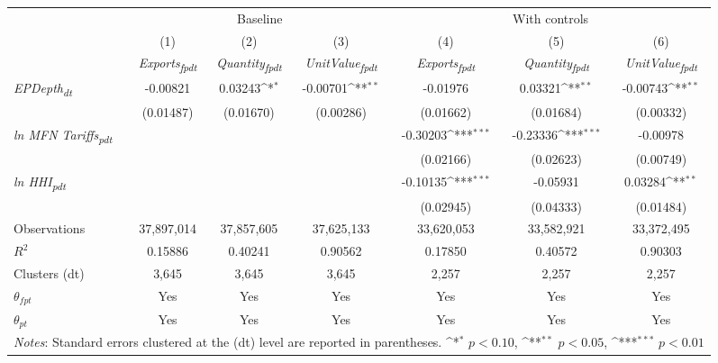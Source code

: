 {
\def\sym#1{\ifmmode^{#1}\else\(^{#1}\)\fi}
\begin{tabular}{l*{6}{c}}
\toprule
&\multicolumn{3}{c}{Baseline}&\multicolumn{3}{c}{With controls}\\\cmidrule(lr){2-4}\cmidrule(lr){5-7}
&(1)&(2)&(3)&(4)&(5)&(6)\\
&\textit{Exports\textsubscript{fpdt}}&\textit{Quantity\textsubscript{fpdt}}&\textit{UnitValue\textsubscript{fpdt}}&\textit{Exports\textsubscript{fpdt}}&\textit{Quantity\textsubscript{fpdt}}&\textit{UnitValue\textsubscript{fpdt}}\\
\midrule
\textit{EPDepth\textsubscript{dt}} & -0.00821 & 0.03243\sym{*} & -0.00701\sym{**} & -0.01976 & 0.03321\sym{**} & -0.00743\sym{**}\\
 & (0.01487) & (0.01670) & (0.00286) & (0.01662) & (0.01684) & (0.00332)\\
\addlinespace
\textit{ln MFN Tariffs\textsubscript{pdt}} &  &  &  & -0.30203\sym{***} & -0.23336\sym{***} & -0.00978\\
 &  &  &  & (0.02166) & (0.02623) & (0.00749)\\
\addlinespace
\textit{ln HHI\textsubscript{pdt}} &  &  &  & -0.10135\sym{***} & -0.05931 & 0.03284\sym{**}\\
 &  &  &  & (0.02945) & (0.04333) & (0.01484)\\
\midrule
Observations & 37,897,014 & 37,857,605 & 37,625,133 & 33,620,053 & 33,582,921 & 33,372,495\\
$R^{2}$ & 0.15886 & 0.40241 & 0.90562 & 0.17850 & 0.40572 & 0.90303\\
Clusters (dt) & 3,645 & 3,645 & 3,645 & 2,257 & 2,257 & 2,257\\
$\theta_{fpt}$ & Yes & Yes & Yes & Yes & Yes & Yes\\
$\theta_{pt}$ & Yes & Yes & Yes & Yes & Yes & Yes\\
\bottomrule
\multicolumn{7}{l}{\footnotesize \textit{Notes}: Standard errors clustered at the (dt) level are reported in parentheses. \sym{*} \(p<0.10\), \sym{**} \(p<0.05\), \sym{***} \(p<0.01\)}\\
\end{tabular}
}
